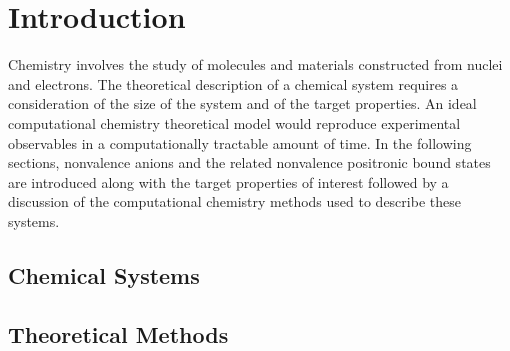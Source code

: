 \chapter{Introduction}

Chemistry involves the study of molecules and materials constructed from nuclei and electrons.
The theoretical description of a chemical system requires a consideration of the size of the system and of the target properties.
An ideal computational chemistry theoretical model would reproduce experimental observables in a computationally tractable amount of time.
In the following sections, nonvalence anions and the related nonvalence positronic bound states are introduced along with the target properties of interest followed by a discussion of the computational chemistry methods used to describe these systems.

\section{Chemical Systems}



\section{Theoretical Methods}









